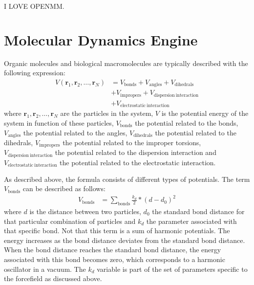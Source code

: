 \documentclass[conference]{IEEEtran}
\begin{document}
I LOVE OPENMM.\cite{eastman2010openmm}



\section{Molecular Dynamics Engine}

Organic molecules and biological macromolecules are typically described with the following expression:
\begin{equation}
    \begin{aligned}
    V(\mathbf{r}_1,\mathbf{r}_2,\ldots,\mathbf{r}_N) &= V_{\mathrm{bonds}} + V_{\mathrm{angles}} + 
                                                        V_{\mathrm{dihedrals}}\\
                                                    &+ V_{\mathrm{impropers}} + V_{\mathrm{dispersion \: interaction}}\\
                                                    &+ V_{\mathrm{electrostatic \: interaction}}
    \end{aligned}
\end{equation}
where $\mathbf{r}_1,\mathbf{r}_2,\ldots,\mathbf{r}_N$ are the particles in the system, $V$ is the potential energy of the
system in function of these particles, $V_{\mathrm{bonds}}$ the potential related to the bonds, $V_{\mathrm{angles}}$ 
the potential related to the angles, $V_{\mathrm{dihedrals}}$ the potential related to the dihedrals, 
$V_{\mathrm{impropers}}$ the potential related to the improper torsions, $V_{\mathrm{dispersion \: interaction}}$ 
the potential related to the dispersion interaction and $V_{\mathrm{electrostatic \: interaction}}$ the potential 
related to the electrostatic interaction. 

As described above, the formula consists of different types of potentials.
The term $V_{\mathrm{bonds}}$ can be described as follows:
\begin{equation}
    \begin{aligned}
    V_{\mathrm{bonds}} &= \sum_{\mathrm{bonds}} \frac{k_d}{2}*{(d-d_0)}^2
    \end{aligned}
\end{equation}
where $d$ is the distance between two particles, $d_0$ the standard bond distance for that particular combination of 
particles and $k_d$ the parameter associated with that specific bond. Not that this term is a sum of harmonic 
potentials. The energy increases as the bond distance deviates from the standard bond distance. When the bond 
distance reaches the standard bond distance, the energy associated with this bond becomes zero, which corresponds 
to a harmonic oscillator in a vacuum. The $k_d$ variable is part of the set of parameters specific to the 
forcefield as discussed above.
\end{document}
